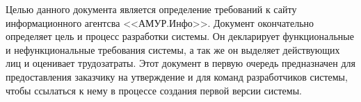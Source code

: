 

Целью данного документа является определение требований к сайту информационного агентсва <<АМУР.Инфо>>.
Документ окончательно определяет цель и процесс разработки системы. 
Он декларирует функциональные и нефункциональные требования системы, а так же он выделяет действующих лиц и оценивает трудозатраты.
Этот документ в первую очередь предназначен для предоставления заказчику на утверждение и для команд разработчиков системы, чтобы ссылаться к нему в процессе создания первой версии системы.


